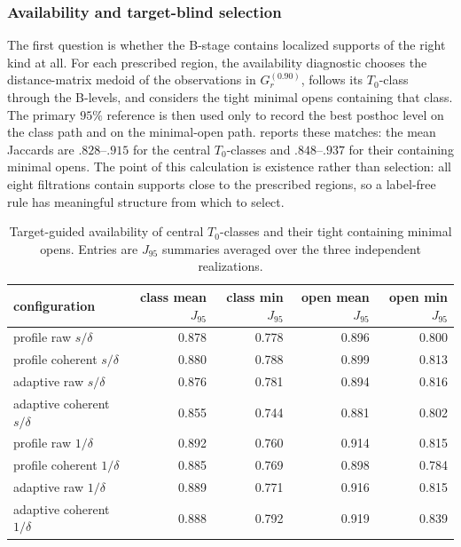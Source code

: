 \documentclass[a4paper,11pt]{article}
\theoremstyle{definition}
\theoremstyle{remark}
\begin{document}
\subsubsection*{Availability and target-blind selection}

The first question is whether the B-stage contains localized supports of the right kind at all. For each prescribed region, the availability diagnostic chooses the distance-matrix medoid of the observations in $G_r^{(0.90)}$, follows its $T_0$-class through the B-levels, and considers the tight minimal opens containing that class. The primary $95\%$ reference is then used only to record the best posthoc level on the class path and on the minimal-open path.  reports these matches: the mean Jaccards are $.828$--$.915$ for the central $T_0$-classes and $.848$--$.937$ for their containing minimal opens. The point of this calculation is existence rather than selection: all eight
filtrations contain supports close to the prescribed regions, so a label-free rule has meaningful structure from which to select.

\begin{table}[!ht]
\centering
\small
\caption{Target-guided availability of central $T_0$-classes and their tight containing minimal opens. Entries are $J_{95}$ summaries averaged over the three independent realizations.}
\label{tab:mixed-bumps-central-results}
\setlength{\tabcolsep}{4.5pt}
\begin{tabular}{@{}lrrrr@{}}
\toprule
configuration & \shortstack{class\\mean $J_{95}$} & \shortstack{class\\min $J_{95}$} & \shortstack{open\\mean $J_{95}$} & \shortstack{open\\min $J_{95}$} \\
\midrule
profile raw $s/\delta$ & 0.878 & 0.778 & 0.896 & 0.800 \\
profile coherent $s/\delta$ & 0.880 & 0.788 & 0.899 & 0.813 \\
adaptive raw $s/\delta$ & 0.876 & 0.781 & 0.894 & 0.816 \\
adaptive coherent $s/\delta$ & 0.855 & 0.744 & 0.881 & 0.802 \\
profile raw $1/\delta$ & 0.892 & 0.760 & 0.914 & 0.815 \\
profile coherent $1/\delta$ & 0.885 & 0.769 & 0.898 & 0.784 \\
adaptive raw $1/\delta$ & 0.889 & 0.771 & 0.916 & 0.815 \\
adaptive coherent $1/\delta$ & 0.888 & 0.792 & 0.919 & 0.839 \\
\bottomrule
\end{tabular}
\end{table}
\end{document}

